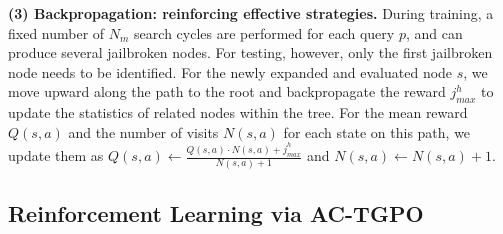 \documentclass[11pt]{article}
\def\attackmethod{GS-MCTS}
\def\trainingmethod{AC-TGPO}
\begin{document}
\textbf{(3) Backpropagation: reinforcing effective strategies.} 
During training, a fixed number of $N_{m}$ search cycles are performed for each query $p$, and can produce several jailbroken nodes. For testing, however, only the first jailbroken node needs to be identified. For the newly expanded and evaluated node $s$, we move upward along the path to the root and backpropagate the reward $j_{max}^{h}$ to update the statistics of related nodes within the tree. For the mean reward $Q(s, a)$ and the number of visits $N(s, a)$ for each state on this path, we update them as 
$Q(s, a) \leftarrow \frac{Q(s, a) \cdot N(s, a) + j_{max}^{h}}{N(s, a) + 1}$ and 
$N(s, a) \leftarrow N(s, a) + 1$.



\subsection{Reinforcement Learning via {\trainingmethod}}
\label{sec:RL} 
\end{document}

